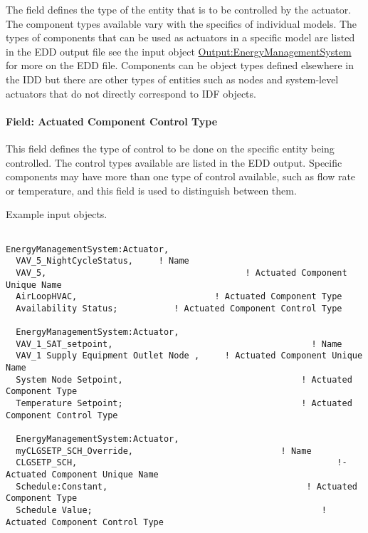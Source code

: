 The field defines the type of the entity that is to be controlled by the actuator. The component types available vary with the specifics of individual models. The types of components that can be used as actuators in a specific model are listed in the EDD output file see the input object \hyperref[outputenergymanagementsystem]{Output:EnergyManagementSystem} for more on the EDD file. Components can be object types defined elsewhere in the IDD but there are other types of entities such as nodes and system-level actuators that do not directly correspond to IDF objects.

\paragraph{Field: Actuated Component Control Type}\label{field-actuated-component-control-type}

This field defines the type of control to be done on the specific entity being controlled. The control types available are listed in the EDD output. Specific components may have more than one type of control available, such as flow rate or temperature, and this field is used to distinguish between them.

Example input objects.

\begin{lstlisting}

EnergyManagementSystem:Actuator,
  VAV_5_NightCycleStatus,     ! Name
  VAV_5,                                       ! Actuated Component Unique Name
  AirLoopHVAC,                           ! Actuated Component Type
  Availability Status;           ! Actuated Component Control Type

  EnergyManagementSystem:Actuator,
  VAV_1_SAT_setpoint,                                       ! Name
  VAV_1 Supply Equipment Outlet Node ,     ! Actuated Component Unique Name
  System Node Setpoint,                                   ! Actuated Component Type
  Temperature Setpoint;                                   ! Actuated Component Control Type

  EnergyManagementSystem:Actuator,
  myCLGSETP_SCH_Override,                             ! Name
  CLGSETP_SCH,                                                   !- Actuated Component Unique Name
  Schedule:Constant,                                       ! Actuated Component Type
  Schedule Value;                                             ! Actuated Component Control Type
\end{lstlisting}

